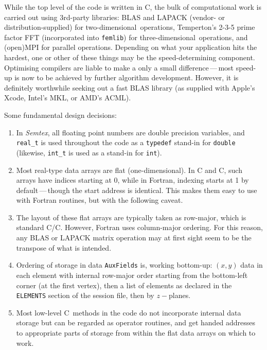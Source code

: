 \documentclass[11pt]{report}
\newcommand{\Semtex}{\emph{Semtex}} \newcommand{\Dog}{\emph{Dog}}
\newcommand\oned{one-di\-men\-sion\-al}
\newcommand\twod{two-di\-men\-sion\-al}
\newcommand\threed{three-di\-men\-sion\-al}
\newcommand\cpp{C\nolinebreak\hspace{-.05em}\raisebox{.3ex}{\footnotesize\bf
+}\nolinebreak\hspace{-.10em}\raisebox{.3ex}{\footnotesize\bf+}}
\begin{document}


While the top level of the code is written in \cpp, the bulk of
computational work is carried out using 3rd-party libraries: BLAS and
LAPACK (vendor- or distribution-supplied) for \twod\ operations,
Temperton's 2-3-5 prime factor FFT (incorporated into \texttt{femlib})
for \threed\ operations, and (open)MPI for parallel operations.
Depending on what your application hits the hardest, one or other of
these things may be the speed-determining component. Optimising
compilers are liable to make a only a small difference\,---\,most
speed-up is now to be achieved by further algorithm development.
However, it is definitely worthwhile seeking out a fast BLAS library
(as supplied with Apple's Xcode, Intel's MKL, or AMD's ACML).

Some fundamental design decisions:
\begin{enumerate}
\item
  In \Semtex, all floating point numbers are double precision
  variables, and \verb|real_t| is used throughout the code as a
  \verb|typedef| stand-in for \verb|double| (likewise, \verb|int_t| is
  used as a stand-in for \verb|int|).
\item
  Most real-type data arrays are flat (\oned).  In C and \cpp, such
  arrays have indices starting at 0, while in Fortran, indexing starts
  at 1 by default\,---\,though the start address is identical. This
  makes them easy to use with Fortran routines, but with the following
  caveat.
\item
  The layout of these flat arrays are typically taken as row-major,
  which is standard C/\cpp. However, Fortran uses column-major
  ordering. For this reason, any BLAS or LAPACK matrix operation may
  at first sight seem to be the transpose of what is intended.
\item
  Ordering of storage in data \verb|AuxFields| is, working bottom-up:
  $(x,y)$ data in each element with internal row-major order starting
  from the bottom-left corner (\ie at the first vertex), then a list
  of elements as declared in the \verb|ELEMENTS| section of the
  session file, then by $z-$planes.
\item
  Most low-level \cpp\ methods in the code do not incorporate internal
  data storage but can be regarded as operator routines, and get
  handed addresses to appropriate parts of storage from within the
  flat data arrays on which to work.
\end{enumerate}
\end{document}

